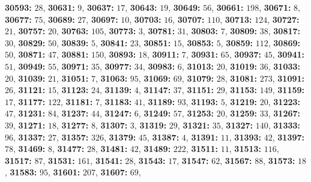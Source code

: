 \textsf{\bfseries 30593:} $28$, \textsf{\bfseries 30631:} $9$, \textsf{\bfseries 30637:} $17$, \textsf{\bfseries 30643:} $19$, \textsf{\bfseries 30649:} $56$, \textsf{\bfseries 30661:} $198$, \textsf{\bfseries 30671:} $8$, \textsf{\bfseries 30677:} $75$, \textsf{\bfseries 30689:} $27$, \textsf{\bfseries 30697:} $10$, \textsf{\bfseries 30703:} $16$, \textsf{\bfseries 30707:} $110$, \textsf{\bfseries 30713:} $124$, \textsf{\bfseries 30727:} $21$, \textsf{\bfseries 30757:} $20$, \textsf{\bfseries 30763:} $105$, \textsf{\bfseries 30773:} $3$, \textsf{\bfseries 30781:} $31$, \textsf{\bfseries 30803:} $7$, \textsf{\bfseries 30809:} $38$, \textsf{\bfseries 30817:} $30$, \textsf{\bfseries 30829:} $50$, \textsf{\bfseries 30839:} $5$, \textsf{\bfseries 30841:} $23$, \textsf{\bfseries 30851:} $15$, \textsf{\bfseries 30853:} $5$, \textsf{\bfseries 30859:} $112$, \textsf{\bfseries 30869:} $50$, \textsf{\bfseries 30871:} $47$, \textsf{\bfseries 30881:} $150$, \textsf{\bfseries 30893:} $18$, \textsf{\bfseries 30911:} $7$, \textsf{\bfseries 30931:} $65$, \textsf{\bfseries 30937:} $45$, \textsf{\bfseries 30941:} $51$, \textsf{\bfseries 30949:} $55$, \textsf{\bfseries 30971:} $35$, \textsf{\bfseries 30977:} $34$, \textsf{\bfseries 30983:} $6$, \textsf{\bfseries 31013:} $20$, \textsf{\bfseries 31019:} $36$, \textsf{\bfseries 31033:} $20$, \textsf{\bfseries 31039:} $21$, \textsf{\bfseries 31051:} $7$, \textsf{\bfseries 31063:} $95$, \textsf{\bfseries 31069:} $69$, \textsf{\bfseries 31079:} $28$, \textsf{\bfseries 31081:} $273$, \textsf{\bfseries 31091:} $26$, \textsf{\bfseries 31121:} $15$, \textsf{\bfseries 31123:} $24$, \textsf{\bfseries 31139:} $4$, \textsf{\bfseries 31147:} $37$, \textsf{\bfseries 31151:} $29$, \textsf{\bfseries 31153:} $149$, \textsf{\bfseries 31159:} $17$, \textsf{\bfseries 31177:} $122$, \textsf{\bfseries 31181:} $7$, \textsf{\bfseries 31183:} $41$, \textsf{\bfseries 31189:} $93$, \textsf{\bfseries 31193:} $5$, \textsf{\bfseries 31219:} $20$, \textsf{\bfseries 31223:} $47$, \textsf{\bfseries 31231:} $84$, \textsf{\bfseries 31237:} $44$, \textsf{\bfseries 31247:} $6$, \textsf{\bfseries 31249:} $57$, \textsf{\bfseries 31253:} $20$, \textsf{\bfseries 31259:} $33$, \textsf{\bfseries 31267:} $39$, \textsf{\bfseries 31271:} $18$, \textsf{\bfseries 31277:} $8$, \textsf{\bfseries 31307:} $3$, \textsf{\bfseries 31319:} $29$, \textsf{\bfseries 31321:} $35$, \textsf{\bfseries 31327:} $140$, \textsf{\bfseries 31333:} $96$, \textsf{\bfseries 31337:} $27$, \textsf{\bfseries 31357:} $326$, \textsf{\bfseries 31379:} $45$, \textsf{\bfseries 31387:} $4$, \textsf{\bfseries 31391:} $11$, \textsf{\bfseries 31393:} $42$, \textsf{\bfseries 31397:} $78$, \textsf{\bfseries 31469:} $8$, \textsf{\bfseries 31477:} $28$, \textsf{\bfseries 31481:} $42$, \textsf{\bfseries 31489:} $222$, \textsf{\bfseries 31511:} $11$, \textsf{\bfseries 31513:} $116$, \textsf{\bfseries 31517:} $87$, \textsf{\bfseries 31531:} $161$, \textsf{\bfseries 31541:} $28$, \textsf{\bfseries 31543:} $17$, \textsf{\bfseries 31547:} $62$, \textsf{\bfseries 31567:} $88$, \textsf{\bfseries 31573:} $18$, \textsf{\bfseries 31583:} $95$, \textsf{\bfseries 31601:} $207$, \textsf{\bfseries 31607:} $69$, 
